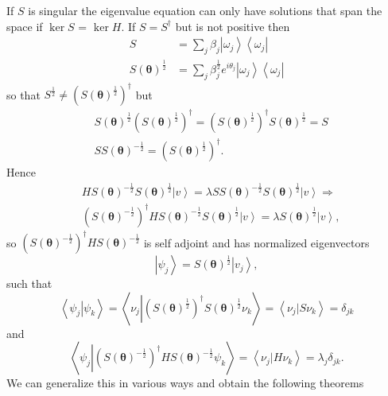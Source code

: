 \documentclass[aps,preprint]{revtex4}%
\begin{document}
If $S$ is singular the eigenvalue equation can only have solutions that span
the space if $\ker S$ = $\ker H.$ If $S=S^{\dagger}$ but is not positive then
\begin{align}
S  &  =\sum_{j}\beta_{j}\left\vert \omega_{j}\right\rangle \left\langle
\omega_{j}\right\vert \\
S\left(  \mathbf{\theta}\right)  ^{\frac{1}{2}}  &  =\sum_{j}\beta_{j}%
^{\frac{1}{2}}e^{i\theta_{j}}\left\vert \omega_{j}\right\rangle \left\langle
\omega_{j}\right\vert
\end{align}
so that $S^{\frac{1}{2}}\neq\left(  S\left(  \mathbf{\theta}\right)
^{\frac{1}{2}}\right)  ^{\dagger}$ but
\begin{align}
&  S\left(  \mathbf{\theta}\right)  ^{\frac{1}{2}}\left(  S\left(
\mathbf{\theta}\right)  ^{\frac{1}{2}}\right)  ^{\dagger}=\left(  S\left(
\mathbf{\theta}\right)  ^{\frac{1}{2}}\right)  ^{\dagger}S\left(
\mathbf{\theta}\right)  ^{\frac{1}{2}}=S\\
&  SS\left(  \mathbf{\theta}\right)  ^{-\frac{1}{2}}=\left(  S\left(
\mathbf{\theta}\right)  ^{\frac{1}{2}}\right)  ^{\dagger}.
\end{align}
Hence
\begin{align}
&  HS\left(  \mathbf{\theta}\right)  ^{-\frac{1}{2}}S\left(  \mathbf{\theta
}\right)  ^{\frac{1}{2}}\left\vert v\right\rangle =\lambda SS\left(
\mathbf{\theta}\right)  ^{-\frac{1}{2}}S\left(  \mathbf{\theta}\right)
^{\frac{1}{2}}\left\vert v\right\rangle \Rightarrow\nonumber\\
&  \left(  S\left(  \mathbf{\theta}\right)  ^{-\frac{1}{2}}\right)  ^{\dagger
}HS\left(  \mathbf{\theta}\right)  ^{-\frac{1}{2}}S\left(  \mathbf{\theta
}\right)  ^{\frac{1}{2}}\left\vert v\right\rangle =\lambda S\left(
\mathbf{\theta}\right)  ^{\frac{1}{2}}\left\vert v\right\rangle ,
\end{align}
so $\left(  S\left(  \mathbf{\theta}\right)  ^{-\frac{1}{2}}\right)
^{\dagger}HS\left(  \mathbf{\theta}\right)  ^{-\frac{1}{2}}$ is self adjoint
and has normalized eigenvectors
\begin{equation}
\left\vert \psi_{j}\right\rangle =S\left(  \mathbf{\theta}\right)  ^{\frac
{1}{2}}\left\vert v_{j}\right\rangle ,
\end{equation}
such that
\begin{equation}
\left\langle \psi_{j}\left\vert \psi_{k}\right.  \right\rangle =\left\langle
\nu_{j}\left\vert \left(  S\left(  \mathbf{\theta}\right)  ^{\frac{1}{2}%
}\right)  ^{\dagger}S\left(  \mathbf{\theta}\right)  ^{\frac{1}{2}}\nu
_{k}\right.  \right\rangle =\left\langle \nu_{j}\left\vert S\nu_{k}\right.
\right\rangle =\delta_{jk}%
\end{equation}
and
\begin{equation}
\left\langle \psi_{j}\left\vert \left(  S\left(  \mathbf{\theta}\right)
^{-\frac{1}{2}}\right)  ^{\dagger}HS\left(  \mathbf{\theta}\right)
^{-\frac{1}{2}}\psi_{k}\right.  \right\rangle =\left\langle \nu_{j}\left\vert
H\nu_{k}\right.  \right\rangle =\lambda_{j}\delta_{jk}.
\end{equation}
We can generalize this in various ways and obtain the following theorems
\end{document}

